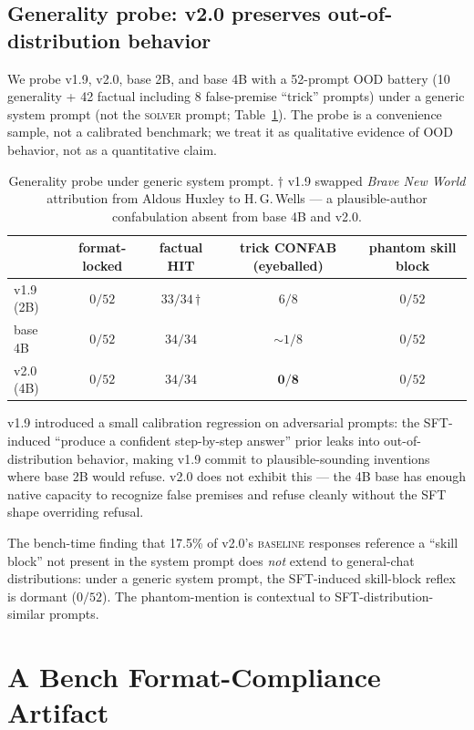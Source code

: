 \documentclass[10pt]{article}
\newcommand{\BL}{\textsc{baseline}\xspace}
\begin{document}
\subsection{Generality probe: v2.0 preserves out-of-distribution behavior}
We probe v1.9, v2.0, base 2B, and base 4B with a 52-prompt OOD battery (10 generality + 42 factual including 8 false-premise ``trick'' prompts) under a generic system prompt (not the \textsc{solver} prompt; Table~\ref{tab:generality}). The probe is a convenience sample, not a calibrated benchmark; we treat it as qualitative evidence of OOD behavior, not as a quantitative claim.

\begin{table}[h]
\centering
\small
\begin{tabular}{@{}lcccc@{}}
\toprule
& format-locked & factual HIT & trick CONFAB (eyeballed) & phantom skill block \\
\midrule
v1.9 (2B) & $0/52$ & $33/34$\,$\dagger$ & $6/8$ & $0/52$ \\
base 4B   & $0/52$ & $34/34$ & $\sim\!1/8$ & $0/52$ \\
v2.0 (4B) & $0/52$ & $34/34$ & $\mathbf{0/8}$ & $0/52$ \\
\bottomrule
\end{tabular}
\caption{Generality probe under generic system prompt. $\dagger$ v1.9 swapped \emph{Brave New World} attribution from Aldous Huxley to H.\,G.\,Wells --- a plausible-author confabulation absent from base 4B and v2.0.}
\label{tab:generality}
\end{table}

v1.9 introduced a small calibration regression on adversarial prompts: the SFT-induced ``produce a confident step-by-step answer'' prior leaks into out-of-distribution behavior, making v1.9 commit to plausible-sounding inventions where base 2B would refuse. v2.0 does not exhibit this --- the 4B base has enough native capacity to recognize false premises and refuse cleanly without the SFT shape overriding refusal.

The bench-time finding that 17.5\% of v2.0's \BL{} responses reference a ``skill block'' not present in the system prompt does \emph{not} extend to general-chat distributions: under a generic system prompt, the SFT-induced skill-block reflex is dormant ($0/52$). The phantom-mention is contextual to SFT-distribution-similar prompts.

\section{A Bench Format-Compliance Artifact}\label{sec:format-artifact}
\end{document}
